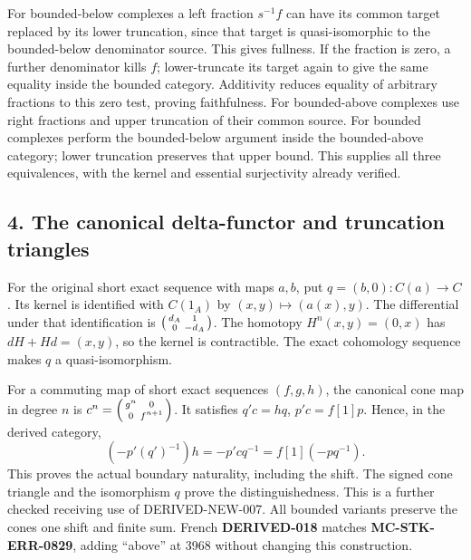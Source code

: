 \documentclass[11pt]{article}
\begin{document}
For bounded-below complexes a left fraction \(s^{-1}f\) can have its common target replaced by its lower truncation,\allowbreak{} since that target is quasi-isomorphic to the bounded-below denominator source. This gives fullness. If the fraction is zero,\allowbreak{} a further denominator kills \(f\); lower-truncate its target again to give the same equality inside the bounded category. Additivity reduces equality of arbitrary fractions to this zero test,\allowbreak{} proving faithfulness. For bounded-above complexes use right fractions and upper truncation of their common source. For bounded complexes perform the bounded-below argument inside the bounded-above category; lower truncation preserves that upper bound. This supplies all three equivalences,\allowbreak{} with the kernel and essential surjectivity already verified.

\subsection{4. The canonical delta-functor and truncation triangles}\label{proofs-3487-4161-the-canonical-delta-functor-and-truncation-triangles}

For the original short exact sequence with maps \(a,b\),\allowbreak{} put \(q=(b,0):C(a)\to C\). Its kernel is identified with \(C(1_A)\) by \((x,y)\mapsto(a(x),y)\). The differential under that identification is \(\begin{psmallmatrix}d_A&1\\0&-d_A\end{psmallmatrix}\). The homotopy \(H^n(x,y)=(0,x)\) has \(dH+Hd=(x,y)\),\allowbreak{} so the kernel is contractible. The exact cohomology sequence makes \(q\) a quasi-isomorphism.

For a commuting map of short exact sequences \((f,g,h)\),\allowbreak{} the canonical cone map in degree \(n\) is \(c^n=\begin{psmallmatrix}g^n&0\\0&f^{n+1}\end{psmallmatrix}\). It satisfies \(q'c=hq\),\allowbreak{} \(p'c=f[1]p\). Hence,\allowbreak{} in the derived category,\allowbreak{} \[
(-p'(q')^{-1})h=-p'c q^{-1}=f[1](-pq^{-1}).
\] This proves the actual boundary naturality,\allowbreak{} including the shift. The signed cone triangle and the isomorphism \(q\) prove the distinguishedness. This is a further checked receiving use of DERIVED-NEW-007. All bounded variants preserve the cone\textquotesingle s one shift and finite sum. French \textbf{DERIVED-018} matches \textbf{MC-STK-ERR-0829},\allowbreak{} adding ``above'' at 3968 without changing this construction.
\end{document}
